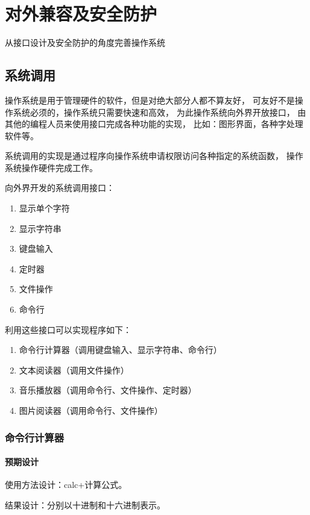 \chapter{对外兼容及安全防护}

从接口设计及安全防护的角度完善操作系统

\section{系统调用}

操作系统是用于管理硬件的软件，但是对绝大部分人都不算友好，
可友好不是操作系统必须的，操作系统只需要快速和高效，
为此操作系统向外界开放接口，
由其他的编程人员来使用接口完成各种功能的实现，
比如：图形界面，各种字处理软件等。

系统调用的实现是通过程序向操作系统申请权限访问各种指定的系统函数，
操作系统操作硬件完成工作。

向外界开发的系统调用接口：
\begin{enumerate}
    \item 显示单个字符
    \item 显示字符串
    \item 键盘输入
    \item 定时器
    \item 文件操作
    \item 命令行
\end{enumerate}

利用这些接口可以实现程序如下：
\begin{enumerate}
    \item 命令行计算器（调用键盘输入、显示字符串、命令行）
    \item 文本阅读器（调用文件操作）
    \item 音乐播放器（调用命令行、文件操作、定时器）
    \item 图片阅读器（调用命令行、文件操作）
\end{enumerate}

\subsection{命令行计算器}

    \subsubsection{预期设计}

    使用方法设计：calc+计算公式。

    结果设计：分别以十进制和十六进制表示。

